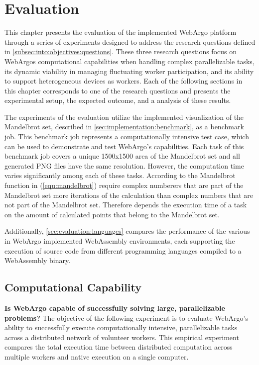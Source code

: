 \chapter{Evaluation}
\label{ch:evaluation}
This chapter presents the evaluation of the implemented WebArgo platform through a series of experiments designed to address the research questions defined in \autoref{subsec:into:objectives:questions}. These three research questions focus on WebArgos computational capabilities when handling complex parallelizable tasks, its dynamic viability in managing fluctuating worker participation, and its ability to support heterogeneous devices as workers. Each of the following sections in this chapter corresponds to one of the research questions and presents the experimental setup, the expected outcome, and a analysis of these results.

The experiments of the evaluation utilize the implemented visualization of the Mandelbrot set, described in \autoref{sec:implementation:benchmark}, as a benchmark job. This benchmark job represents a computationally intensive test case, which can be used to demonstrate and test WebArgo's capabilities. Each task of this benchmark job covers a unique 1500x1500 area of the Mandelbrot set and all generated \ac{PNG} files have the same resolution. However, the computation time varies significantly among each of these tasks. According to the Mandelbrot function in (\ref{equ:mandelbrot}) require complex numberers that are part of the Mandelbrot set more iterations of the calculation than complex numbers that are not part of the Mandelbrot set. Therefore depends the execution time of a task on the amount of calculated points that belong to the Mandelbrot set.

Additionally, \autoref{sec:evaluation:languages} compares the performance of the various in WebArgo implemented WebAssembly environments, each supporting the execution of source code from different programming languages compiled to a WebAssembly binary.

\section{Computational Capability}
\label{sec:evaluation:computation}
\textbf{Is WebArgo capable of successfully solving large, parallelizable problems?} 
\newline
The objective of the following experiment is to evaluate WebArgo's ability to successfully execute computationally intensive, parallelizable tasks across a distributed network of volunteer workers. This empirical experiment compares the total execution time between distributed computation across multiple workers and native execution on a single computer.

